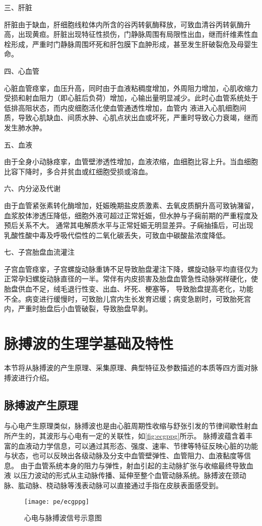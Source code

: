 三、肝脏

肝脏由于缺血，肝细胞线粒体内所含的谷丙转氨酶释放，可致血清谷丙转氨酶升高，出现黄疸。肝脏出现特征性损伤，门静脉周围有局限性出血，继而纤维素性血栓形成，严重时门静脉周围坏死和肝包膜下血肿形成，甚至发生肝破裂危及母婴生命。

四、心血管

心脏血管痉挛，血压升高，同时由于血液粘稠度增加，外周阻力增加，心肌收缩力受损和射血阻力（即心脏后负荷）增加，心输出量明显减少。此时心血管系统处于低排高阻状态，而内皮细胞活化使血管通透性增加，血管内
液进入心肌细胞间质，导致心肌缺血、间质水肿、心肌点状出血或坏死，严重时导致心力衰竭，继而发生肺水肿。

五、血液

由于全身小动脉痉挛，血管壁渗透性增加，血液浓缩，血细胞比容上升。当血细胞比容下降时，多合并贫血或红细胞受损或溶血。

六、内分泌及代谢

由于血管紧张素转化酶增加，妊娠晚期盐皮质激素、去氧皮质酮升高可致钠潴留，血浆胶体渗透压降低，细胞外液可超过正常妊娠，但水肿与子痫前期的严重程度及预后关系不大。
通常其电解质水平与正常妊娠无明显差异。子痫抽搐后，可出现乳酸性酸中毒及呼吸代偿性的二氧化碳丢失，可致血中碳酸盐浓度降低。

七、子宫胎盘血流灌注

子宫血管痉挛，子宫螺旋动脉重铸不足导致胎盘灌注下降，螺旋动脉平均直径仅为正常孕妇螺旋动脉直径的一半。常伴有内皮损害及胎盘血管急性动脉粥样硬化，使胎盘供血不足，绒毛退行性变、出血、坏死、梗塞等，
导致胎盘提高老化，功能不全。病变进行缓慢时，可致胎儿宫内生长发育迟缓；病变急剧时，可致胎死宫内，严重时胎盘后小血管破裂，导致胎盘早剥。

\section{脉搏波的生理学基础及特性}
本节将从脉搏波的产生原理、采集原理、典型特征及参数描述的本质等四方面对脉搏波进行介绍。

\subsection{脉搏波产生原理}
与心电产生原理类似，脉搏波也是由心脏周期性收缩与舒张引发的节律间歇性射血所产生的，其波形与心电有一定的关联性，如\autoref{fig:ecgppg}所示\cite{Allen2007}。
脉搏波蕴含着丰富的血液动力学信息，可以通过其形态、强度、速率、节律等特征反映心脏的功能与状态，也可以反映出各级动脉及分支中血管壁弹性、血管阻力、血液黏度等信息。
由于血管系统本身的阻力与弹性，射血引起的主动脉扩张与收缩最终导致血液
以压力波动的形式从主动脉传播、延伸至整个血管动脉系统。脉搏波在颈动脉、肱动脉、桡动脉等浅表动脉可以直接通过手指在皮肤表面感受到\cite{PPGYY}。
\begin{figure}[htbp]
    \centering
    \texttt{[image: pe/ecgppg]}
    \caption[心电与脉搏波信号示意图]{\label{fig:ecgppg}心电与脉搏波信号示意图\cite{Allen2007}}
\end{figure}

